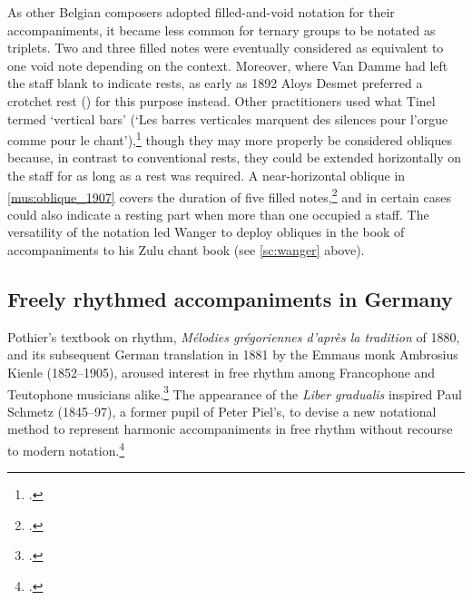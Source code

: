 As other Belgian composers adopted filled-and-void notation for their accompaniments, it became less common for ternary groups to be notated as triplets.
Two and three filled notes were eventually considered as equivalent to one void note depending on the context.
\label{sc:desmet}%
Moreover, where Van Damme had left the staff blank to indicate rests, as early as 1892 Aloys Desmet preferred a crotchet rest () for this purpose instead.
%
Other practitioners used what Tinel termed `vertical bars' (`Les barres verticales marquent des silences pour l'orgue comme pour le chant'),\footcite[1:18, 20; The word `barres' is absent from the first volume but appears in vol.~4 p. 1]{Melodieschantgregorien1892} though they may more properly be considered obliques because, in contrast to conventional rests, they could be extended horizontally on the staff for as long as a rest was required.
A near-horizontal oblique in \cref{mus:oblique_1907} covers the duration of five filled notes,\footcite[11]{AspergesmeVidi1907} and in certain cases could also indicate a resting part when more than one occupied a staff.
The versatility of the notation led Wanger to deploy obliques in the book of accompaniments to his Zulu chant book (see \cref{sc:wanger} above).
\nowidow[2]
%


\subsection{Freely rhythmed accompaniments in Germany}
%
Pothier's textbook on rhythm, \emph{Mélodies grégoriennes d'après la tradition} of 1880, and its subsequent German translation in 1881 by the Emmaus monk Ambrosius Kienle (1852--1905), aroused interest in free rhythm among Francophone and Teutophone musicians alike.\footcite{PothiergregorianischeChoralseine1881}
The appearance of the \emph{Liber gradualis} inspired Paul Schmetz (1845--97), a former pupil of Peter Piel's, to devise a new notational method to represent harmonic accompaniments in free rhythm without recourse to modern notation.\footcite[243]{PaulSchmetz1897}

